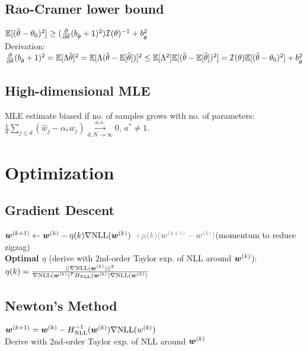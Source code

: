 % 
% 
\subsection*{Rao-Cramer lower bound}    
$\mathbb{E}[(\hat{\kern0pt \theta} - \theta_0)^2] \geq (\frac{\partial}{\partial\theta}(b_{\hat{\kern0pt \theta}}+1)^2)\mathcal{I}(\theta)^{-1} + b_{\hat{\kern0pt \theta}}^2$\\
Derivation: 
$\frac{\partial}{\partial\theta}(b_{\hat{\kern0pt \theta}}+1)^2 = 
 \mathbb{E}[\Lambda\hat{\kern0pt \theta}]^2 = \mathbb{E}[\Lambda(\hat{\kern0pt \theta} - \mathbb{E}[\hat{\kern0pt \theta}])]^2 \leq \mathbb{E}[\Lambda^2]\mathbb{E}[(\hat{\kern0pt \theta}-\mathbb{E}[\hat{\kern0pt \theta}])^2] = \mathcal{I}(\theta)\mathbb{E}[(\hat{\kern0pt \theta} - \theta_0)^2] + b_{\hat{\kern0pt \theta}}^2
$

\subsection*{High-dimensional MLE}
MLE estimate biased if no. of samples grows with no. of parameters:
$\frac{1}{d}\sum_{j\leq d}(\hat w_j-\alpha_* w_j)\overset{a.s.}{\underset{d,N\to\infty}{\to}}0$, $a^* \neq 1$.

\section*{Optimization}
\subsection*{Gradient Descent}
${\bm{w}}^{(k+1)} \leftarrow {\bm{w}}^{(k)} - \eta(k)\nabla\mathrm{NLL}({\bm{w}}^{(k)})$ {\color{gray}  $\color{gray}+ \mu(k)(\vw^{(k+1)} - \vw^{(k)})$}(momentum to reduce zigzag)\\
\textbf{Optimal $\eta$} (derive with 2nd-order Taylor exp. of NLL around ${\bm{w}}^{(k)}$):\\
$\eta(k)=\frac{||\nabla\mathrm{NLL}({\bm{w}}^{(k)})||^2}{\nabla\mathrm{NLL}({\bm{w}}^{(k)})^TH_{\mathrm{NLL}}({\bm{w}}^{(k)})\nabla\mathrm{NLL}({\bm{w}}^{(k)})}$

\subsection*{Newton's Method}
\mbox{${\bm{w}}^{(k+1)}={\bm{w}}^{(k)} - H_{\mathrm{NLL}}^{-1}({\bm{w}}^{(k)})\nabla\mathrm{NLL}(w^{(k)})$}\\
Derive with 2nd-order Taylor exp. of NLL around ${\bm{w}}^{(k)}$